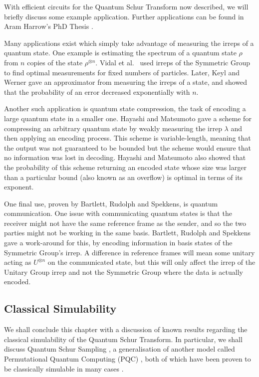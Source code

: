 With efficient circuits for the Quantum Schur Transform now described, we will briefly discuss some example application. Further applications can be found in Aram Harrow's PhD Thesis \cite{harrow2005}.

Many applications exist which simply take advantage of measuring the irreps of a quantum state. One example is estimating the spectrum of a quantum state $\rho$ from $n$ copies of the state $\rho^{\otimes n}$. Vidal et al.~\cite{vidal1999} used irreps of the Symmetric Group to find optimal measurements for fixed numbers of particles. Later, Keyl and Werner \cite{keyl2001} gave an approximator from measuring the irreps of a state, and showed that the probability of an error decreased exponentially with $n$.

Another such application is quantum state compression, the task of encoding a large quantum state in a smaller one. Hayashi and Matsumoto \cite{hayashi2002, hayashi2002simple} gave a scheme for compressing an arbitrary quantum state by weakly measuring the irrep $\lambda$ and then applying an encoding process. This scheme is variable-length, meaning that the output was not guaranteed to be bounded but the scheme would ensure that no information was lost in decoding. Hayashi and Matsumoto also showed that the probability of this scheme returning an encoded state whose size was larger than a particular bound (also known as an overflow) is optimal in terms of its exponent.

One final use, proven by Bartlett, Rudolph and Spekkens\cite{bartlett2001}, is quantum communication. One issue with communicating quantum states is that the receiver might not have the same reference frame as the sender, and so the two parties might not be working in the same basis. Bartlett, Rudolph and Spekkens gave a work-around for this, by encoding information in basis states of the Symmetric Group's irrep. A difference in reference frames will mean some unitary acting as $U^{\otimes n}$ on the communicated state, but this will only affect the irrep of the Unitary Group irrep and not the Symmetric Group where the data is actually encoded.

\subsection{Classical Simulability}
\label{ssec:schur-simulation}

We shall conclude this chapter with a discussion of known results regarding the classical simulability of the Quantum Schur Transform. In particular, we shall discuss Quantum Schur Sampling \cite{havlicek2018}, a generalisation of another model called Permutational Quantum Computing (PQC) \cite{jordan2010}, both of which have been proven to be classically simulable in many cases \cite{havlicek2019}.

